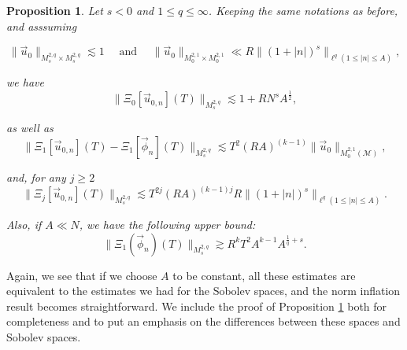 \documentclass[letterpaper, 11pt,  reqno]{amsart}
\newtheorem{proposition}[theorem]{Proposition}
\newcommand{\1}{\hspace{0.5mm}\text{I}\hspace{0.5mm}}
\newcommand{\noi}{\noindent}
\newcommand{\M}{\mathcal{M}}
\newcommand{\les}{\lesssim}
\newcommand{\ges}{\gtrsim}
\numberwithin{equation}{section}
\numberwithin{theorem}{section}
\newcommand{\abs}[1]{\lvert#1\rvert}
\begin{document}
\begin{proposition}
\label{PROP:EstForMs2qspaces}
Let $s < 0$ and $1 \leq q \leq \infty$. Keeping the same notations as before, and asssuming

$$
\| \vec{u}_0 \|_{M^{2,q}_s \times M^{2,q}_s} \les 1 \quad \text{ and }  \quad \| \vec{u}_0 \|_{M^{2,1}_0 \times M^{2,1}_0}  \ll  R \| (1 + \abs{n})^s \|_{\ell^q ( 1 \leq \abs{n} \leq A)},
$$

\noi we have 
\begin{equation}
\label{EQ:normXi0M}
\| \Xi_0 [\vec{u}_{0,n}](T) \|_{M_s^{2,q}} \les 1 + R N^s A^{\frac 12},
\end{equation}

\noi as well as
\begin{equation}
\label{EQ:EstXi1UpperM}
\|\Xi_1 [\vec{u}_{0, n}] (T) - \Xi_1 [\vec{\phi}_{ n}] (T)  \|_{M_s^{2,q}} \les T^{2} (RA)^{(k-1)} \| \vec{u}_0 \|_{M^{2,1}_0( \M)},
\end{equation}

\noi and, for any $j \geq 2$
\begin{equation}
\label{EQ:EstXijFL}
\| \Xi_j [\vec{u}_{0,n}] (T) \|_{M_s^{2,q}}   \les T^{2j} (RA)^{(k-1)j} R \| (1 + \abs{n})^s \|_{\ell^q ( 1 \leq \abs{n} \leq A)}.
\end{equation}

\noi Also, if $A \ll N$, we have the following upper bound:
\begin{equation}
\label{EQ:EstSecondPicardFL}
\| \Xi_1 (\vec{\phi}_n) (T) \|_{M_s^{2,q}} \ges R^k T^2 A^{k - 1}A^{ \frac 1q + s}.
\end{equation}
\end{proposition}

Again, we see that if we choose $A$ to be constant, all these estimates are equivalent to the estimates we had for the Sobolev spaces, and the norm inflation result becomes straightforward. We include the proof of Proposition \ref{PROP:EstForMs2qspaces} both for completeness and to put an emphasis on the differences between these spaces and Sobolev spaces.
\end{document}
